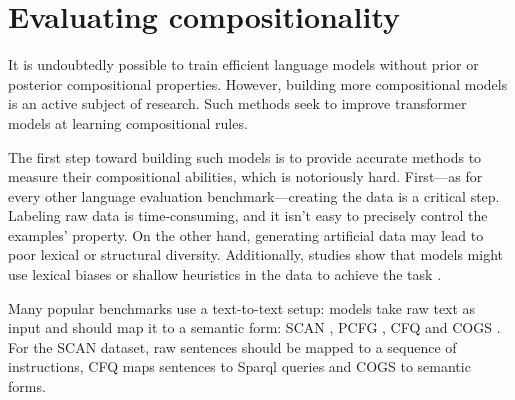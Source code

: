 \section{Evaluating compositionality}

It is undoubtedly possible to train efficient language models without prior or posterior compositional properties. However, building more compositional models is an active subject of research. Such methods seek to improve transformer models at learning compositional rules.

The first step toward building such models is to provide accurate methods to measure their compositional abilities, which is notoriously hard. First—as for every other language evaluation benchmark—creating the data is a critical step. Labeling raw data is time-consuming, and it isn't easy to precisely control the examples' property. On the other hand, generating artificial data may lead to poor lexical or structural diversity. Additionally, studies show that models might use lexical biases or shallow heuristics in the data to achieve the task \parencite{linzen_18}. 

Many popular benchmarks use a text-to-text setup: models take raw text as input and should map it to a semantic form: SCAN \parencite{lake_18}, PCFG \parencite{hupkes_20}, CFQ \parencite{keysers_20} and COGS \parencite{kim_20}. For the SCAN dataset, raw sentences should be mapped to a sequence of instructions, CFQ maps sentences to Sparql queries and COGS to semantic forms.

